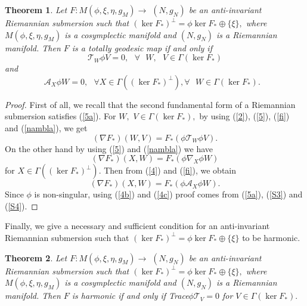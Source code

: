 \documentclass{amsart}
\newtheorem{theorem}{Theorem}
\theoremstyle{plain}
\numberwithin{equation}{section}
\begin{document}
\begin{theorem}
Let $F:M(\phi ,\xi ,\eta ,g_{M})\rightarrow $ $(N,g_{N})$ be an
anti-invariant Riemannian submersion such that $(\ker F_{\ast })^{\bot
}=\phi \ker F_{\ast }\oplus \{\xi \},$ where $M(\phi ,\xi ,\eta ,g_{M})$ is
a cosymplectic manifold and $(N,g_{N})$ is a Riemannian manifold. Then $F$
is a totally geodesic map if and only if\begin{equation}
\mathcal{T}_{W}\phi V=0,\text{ \ \ }\forall \text{ }W,\text{ }V\in \Gamma
(\ker F_{\ast })  \label{S1}
\end{equation}and\begin{equation}
\mathcal{A}_{X}\phi W=0,\text{ \ }\forall X\in \Gamma ((\ker F_{\ast
})^{\bot }),\forall \text{ }W\in \Gamma (\ker F_{\ast }).\text{\ }
\label{S2}
\end{equation}
\end{theorem}

\begin{proof}
First of all, we recall that the second fundamental form of a Riemannian
submersion satisfies (\ref{5a}). For $W,$ $V\in \Gamma (\ker F_{\ast }),$ by
using (\ref{2}), (\ref{5}), (\ref{fi}) and (\ref{nambla}), we get\begin{equation}
(\nabla F_{\ast })(W,V)=F_{\ast }(\phi \mathcal{T}_{W}\phi V).  \label{S3}
\end{equation}On the other hand by using (\ref{5}) and (\ref{nambla}) we have\begin{equation*}
(\nabla F_{\ast })(X,W)=F_{\ast }(\phi \nabla _{X}\phi W)
\end{equation*}for $X\in \Gamma ((\ker F_{\ast })^{\bot }).$ Then from (\ref{4}) and (\ref{fi}), we obtain 
\begin{equation}
(\nabla F_{\ast })(X,W)=F_{\ast }(\phi \mathcal{A}_{X}\phi W).  \label{S4}
\end{equation}Since $\phi $ is non-singular, using (\ref{4b}) and (\ref{4c}) proof comes
from (\ref{5a}), (\ref{S3}) and (\ref{S4}).
\end{proof}

Finally, we give a necessary and sufficient condition for an anti-invariant
Riemannian submersion such that $(\ker F_{\ast })^{\bot }=\phi \ker F_{\ast
}\oplus \{\xi \}$ to be harmonic.

\begin{theorem}
Let $F:M(\phi ,\xi ,\eta ,g_{M})\rightarrow $ $(N,g_{N})$ be an
anti-invariant Riemannian submersion such that $(\ker F_{\ast })^{\bot
}=\phi \ker F_{\ast }\oplus \{\xi \},$ where $M(\phi ,\xi ,\eta ,g_{M})$ is
a cosymplectic manifold and $(N,g_{N})$ is a Riemannian manifold. Then $F$
is harmonic if and only if Trace$\phi \mathcal{T}_{V}=0$ for $V\in \Gamma
(\ker F_{\ast }).$
\end{theorem}
\end{document}
